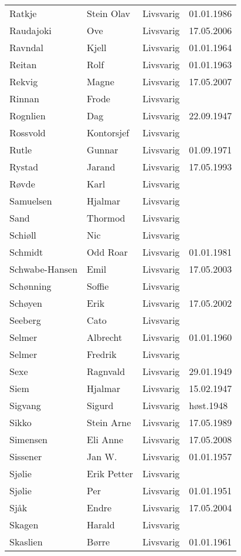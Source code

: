 \begin{longtable}{llll}
Ratkje	&	Stein Olav	&	Livsvarig 	&	01.01.1986	\\
Raudajoki	&	Ove	&	Livsvarig	&	17.05.2006	\\
Ravndal	&	Kjell	&	Livsvarig 	&	01.01.1964	\\
Reitan	&	Rolf	&	Livsvarig 	&	01.01.1963	\\
Rekvig	&	Magne	&	Livsvarig	&	17.05.2007	\\
Rinnan	&	Frode	&	Livsvarig 	&		\\
Rognlien	&	Dag	&	Livsvarig 	&	22.09.1947	\\
Rossvold	&	Kontorsjef	&	Livsvarig 	&		\\
Rutle	&	Gunnar	&	Livsvarig 	&	01.09.1971	\\
Rystad	&	Jarand	&	Livsvarig 	&	17.05.1993	\\
Røvde	&	Karl	&	Livsvarig 	&		\\
Samuelsen	&	Hjalmar	&	Livsvarig 	&		\\
Sand	&	Thormod	&	Livsvarig 	&		\\
Schiøll	&	Nic	&	Livsvarig 	&		\\
Schmidt	&	Odd Roar	&	Livsvarig 	&	01.01.1981	\\
Schwabe-Hansen 	&	Emil	&	Livsvarig	&	17.05.2003	\\
Schønning	&	Soffie	&	Livsvarig 	&		\\
Schøyen 	&	Erik	&	Livsvarig	&	17.05.2002	\\
Seeberg	&	Cato	&	Livsvarig 	&		\\
Selmer	&	Albrecht	&	Livsvarig 	&	01.01.1960	\\
Selmer	&	Fredrik	&	Livsvarig 	&		\\
Sexe	&	Ragnvald	&	Livsvarig 	&	29.01.1949	\\
Siem	&	Hjalmar	&	Livsvarig 	&	15.02.1947	\\
Sigvang	&	Sigurd	&	Livsvarig	&	høst.1948	\\
Sikko	&	Stein Arne	&	Livsvarig 	&	17.05.1989	\\
Simensen	&	Eli Anne	&	Livsvarig	&	17.05.2008	\\
Sissener	&	Jan W.	&	Livsvarig 	&	01.01.1957	\\
Sjølie	&	Erik Petter	&	Livsvarig 	&		\\
Sjølie	&	Per	&	Livsvarig 	&	01.01.1951	\\
Sjåk 	&	Endre	&	Livsvarig	&	17.05.2004	\\
Skagen	&	Harald	&	Livsvarig 	&		\\
Skaslien	&	Børre	&	Livsvarig 	&	01.01.1961	\\

\end{longtable}
